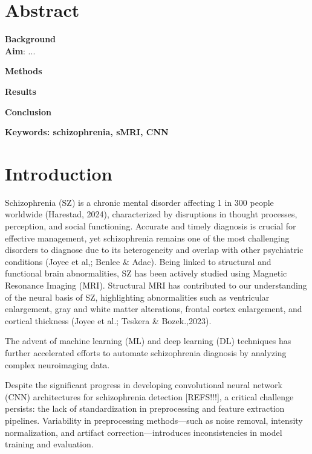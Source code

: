 



\maketitle

\section{Abstract}

\textbf{Background}\\
\lipsum[1]
\textbf{Aim}: ...

\textbf{Methods}\\
\lipsum[1]

\textbf{Results}\\
\lipsum[1]

\textbf{Conclusion}\\
\lipsum[1]

\textbf{Keywords: schizophrenia, sMRI, CNN}

\section{Introduction}

Schizophrenia (SZ) is a chronic mental disorder affecting 1 in 300 people worldwide (Harestad, 2024), characterized by disruptions in thought processes, perception, and social functioning. Accurate and timely diagnosis is crucial for effective management, yet schizophrenia remains one of the most challenging disorders to diagnose due to its heterogeneity and overlap with other psychiatric conditions (Joyee et al,; Benlee & Adac). Being linked to structural and functional brain abnormalities, SZ has been actively studied using Magnetic Resonance Imaging (MRI). Structural MRI has contributed to our understanding of the neural basis of SZ, highlighting abnormalities such as ventricular enlargement, gray and white matter alterations, frontal cortex enlargement, and cortical thickness (Joyee et al.; Teskera & Bozek.,2023).


The advent of machine learning (ML) and deep learning (DL) techniques has further accelerated efforts to automate schizophrenia diagnosis by analyzing complex neuroimaging data.

Despite the significant progress in developing convolutional neural network (CNN) architectures for schizophrenia detection [REFS!!!], a critical challenge persists: the lack of standardization in preprocessing and feature extraction pipelines. Variability in preprocessing methods---such as noise removal, intensity normalization, and artifact correction—introduces inconsistencies in model training and evaluation.


